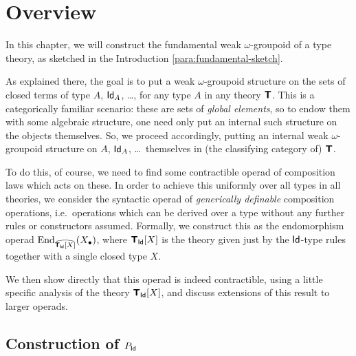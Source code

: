 











\section{Overview}

In this chapter, we will construct the fundamental weak $\omega$-groupoid of a type theory, as sketched in the Introduction \ref{para:fundamental-sketch}.

As explained there, the goal is to put a weak $\omega$-groupoid structure on the sets of closed terms of type $A$, $\mathsf{Id}_A$, \ldots, for any type $A$ in any theory $\textbf{\textsf{T}}$.  This is a categorically familiar scenario: these are sets of \emph{global elements}, so to endow them with some algebraic structure, one need only put an internal such structure on the objects themselves.  So, we proceed accordingly, putting an internal weak $\omega$-groupoid structure on $A$, $\mathsf{Id}_A$, \ldots\ themselves in (the classifying category of) $\textbf{\textsf{T}}$.

To do this, of course, we need to find some contractible operad of composition laws which acts on these.  In order to achieve this uniformly over all types in all theories, we consider the syntactic operad of \emph{generically definable} composition operations, i.e.\ operations which can be derived over a type without any further rules or constructors assumed.  Formally, we construct this as the endomorphism operad $\mathrm{End}_{\widehat{\textbf{\textsf{T}}_{\mathsf{Id}} [X]}}(X_\bullet)$, where $\textbf{\textsf{T}}_{\mathsf{Id}} [X]$ is the theory given just by the $\mathsf{Id}$-type rules together with a single closed type $X$.

We then show directly that this operad is indeed contractible, using a little specific analysis of the theory $\textbf{\textsf{T}}_{\mathsf{Id}}[X]$, and discuss extensions of this result to larger operads.

\subsection*{Construction of \texorpdfstring{$P_{\mathsf{Id}}$}{P\_Id}}


